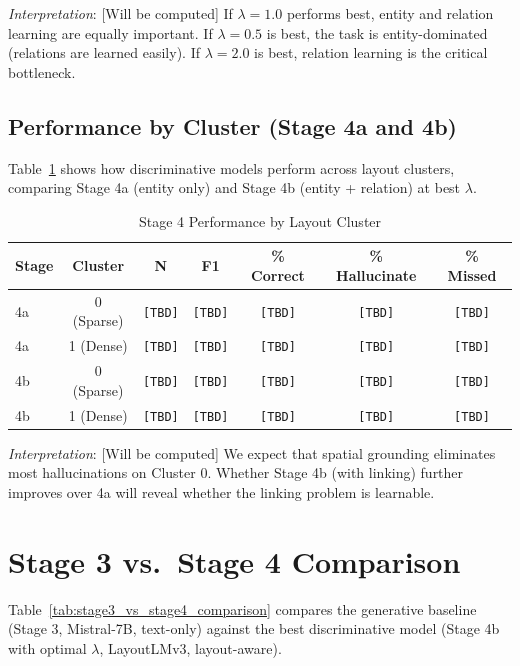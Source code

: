 \textit{Interpretation}: [Will be computed] If $\lambda=1.0$ performs best, entity and relation learning are equally important. If $\lambda=0.5$ is best, the task is entity-dominated (relations are learned easily). If $\lambda=2.0$ is best, relation learning is the critical bottleneck.

\subsection{Performance by Cluster (Stage 4a and 4b)}
\label{sec:stage4_by_cluster}

Table~\ref{tab:stage4_cluster_performance} shows how discriminative models perform across layout clusters, comparing Stage 4a (entity only) and Stage 4b (entity + relation) at best $\lambda$.

\begin{table}[ht]
\centering
\caption{Stage 4 Performance by Layout Cluster}
\label{tab:stage4_cluster_performance}
\begin{tabular}{@{}lcccccc@{}}
\toprule
\textbf{Stage} & \textbf{Cluster} & \textbf{N} & \textbf{F1} & \textbf{\% Correct} & \textbf{\% Hallucinate} & \textbf{\% Missed} \\
\midrule
4a & 0 (Sparse) & \texttt{[TBD]} & \texttt{[TBD]} & \texttt{[TBD]} & \texttt{[TBD]} & \texttt{[TBD]} \\
4a & 1 (Dense) & \texttt{[TBD]} & \texttt{[TBD]} & \texttt{[TBD]} & \texttt{[TBD]} & \texttt{[TBD]} \\
4b & 0 (Sparse) & \texttt{[TBD]} & \texttt{[TBD]} & \texttt{[TBD]} & \texttt{[TBD]} & \texttt{[TBD]} \\
4b & 1 (Dense) & \texttt{[TBD]} & \texttt{[TBD]} & \texttt{[TBD]} & \texttt{[TBD]} & \texttt{[TBD]} \\
\bottomrule
\end{tabular}
\end{table}

\textit{Interpretation}: [Will be computed] We expect that spatial grounding eliminates most hallucinations on Cluster 0. Whether Stage 4b (with linking) further improves over 4a will reveal whether the linking problem is learnable.

\section{Stage 3 vs.\ Stage 4 Comparison}
\label{sec:stage3_vs_stage4}

Table~\ref{tab:stage3_vs_stage4_comparison} compares the generative baseline (Stage 3, Mistral-7B, text-only) against the best discriminative model (Stage 4b with optimal $\lambda$, LayoutLMv3, layout-aware).

